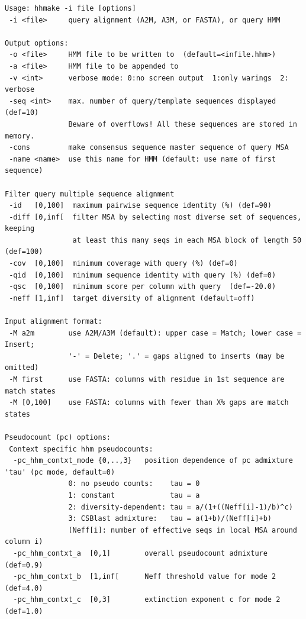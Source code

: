\documentclass[11pt,a4paper]{article}
\begin{document}
\small 
\begin{verbatim}
Usage: hhmake -i file [options]                                       
 -i <file>     query alignment (A2M, A3M, or FASTA), or query HMM         

Output options:                                                           
 -o <file>     HMM file to be written to  (default=<infile.hhm>)          
 -a <file>     HMM file to be appended to                                 
 -v <int>      verbose mode: 0:no screen output  1:only warings  2: verbose
 -seq <int>    max. number of query/template sequences displayed (def=10)  
               Beware of overflows! All these sequences are stored in memory.
 -cons         make consensus sequence master sequence of query MSA 
 -name <name>  use this name for HMM (default: use name of first sequence)   

Filter query multiple sequence alignment                                     
 -id   [0,100]  maximum pairwise sequence identity (%) (def=90)   
 -diff [0,inf[  filter MSA by selecting most diverse set of sequences, keeping 
                at least this many seqs in each MSA block of length 50 (def=100) 
 -cov  [0,100]  minimum coverage with query (%) (def=0) 
 -qid  [0,100]  minimum sequence identity with query (%) (def=0) 
 -qsc  [0,100]  minimum score per column with query  (def=-20.0)
 -neff [1,inf]  target diversity of alignment (default=off)

Input alignment format:                                                    
 -M a2m        use A2M/A3M (default): upper case = Match; lower case = Insert;
               '-' = Delete; '.' = gaps aligned to inserts (may be omitted)   
 -M first      use FASTA: columns with residue in 1st sequence are match states
 -M [0,100]    use FASTA: columns with fewer than X% gaps are match states   

Pseudocount (pc) options:                                                        
 Context specific hhm pseudocounts:
  -pc_hhm_contxt_mode {0,..,3}   position dependence of pc admixture 'tau' (pc mode, default=0) 
               0: no pseudo counts:    tau = 0                                  
               1: constant             tau = a                                  
               2: diversity-dependent: tau = a/(1+((Neff[i]-1)/b)^c)            
               3: CSBlast admixture:   tau = a(1+b)/(Neff[i]+b)                 
               (Neff[i]: number of effective seqs in local MSA around column i) 
  -pc_hhm_contxt_a  [0,1]        overall pseudocount admixture (def=0.9)                        
  -pc_hhm_contxt_b  [1,inf[      Neff threshold value for mode 2 (def=4.0)                      
  -pc_hhm_contxt_c  [0,3]        extinction exponent c for mode 2 (def=1.0)                     


\end{verbatim}
\end{document}
